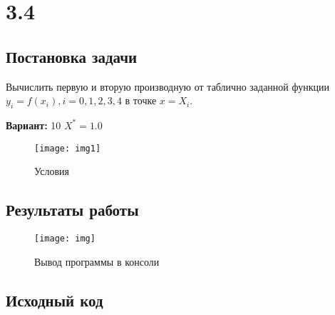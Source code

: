 \section* {3.4}

\subsection{Постановка задачи}
Вычислить первую и вторую производную от таблично заданной функции $y_i=f(x_i), i=0,1,2,3,4$  в точке $x=X_i$.   

{\bfseries Вариант:} 10
$X^*=1.0$

\begin{figure}[h!]
\centering
\texttt{[image: img1]}
\caption{Условия}
\end{figure}

\subsection{Результаты работы}
\begin{figure}[h!]
\centering
\texttt{[image: img]}
\caption{Вывод программы в консоли}
\end{figure}
\pagebreak


\subsection{Исходный код}
% 

% 
% 
% 